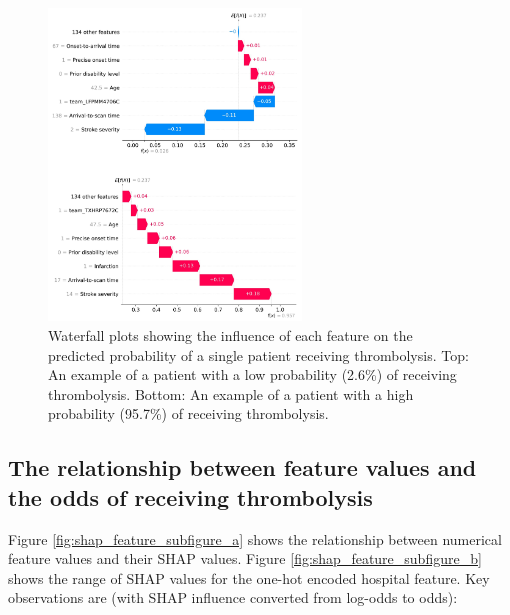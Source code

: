 \begin{figure}[!h]
\centering
\includegraphics[width=0.6\textwidth]{./images/waterfall}
\caption{Waterfall plots showing the influence of each feature on the predicted probability of a single patient receiving thrombolysis. Top: An example of a patient with a low probability (2.6\%) of receiving thrombolysis. Bottom: An example of a patient with a high probability (95.7\%) of receiving thrombolysis.}
\label{fig:results_waterfall}
\end{figure}


\subsection{The relationship between feature values and the odds of receiving thrombolysis}

Figure \ref{fig:shap_feature_subfigure_a} shows the relationship between numerical feature values and their SHAP values. Figure \ref{fig:shap_feature_subfigure_b} shows the range of SHAP values for the one-hot encoded hospital feature. Key observations are (with SHAP influence converted from log-odds to odds):

